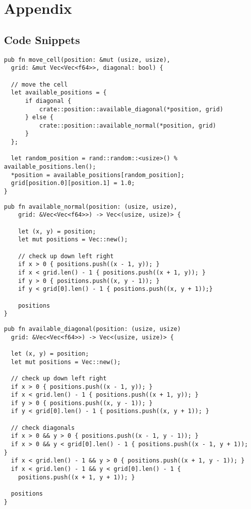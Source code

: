 \chapter{Appendix}

\section{Code Snippets} \label{sec:code}

\begin{lstlisting}[caption=Move Cell (Rust), label={lst:moveCell},captionpos=b]
pub fn move_cell(position: &mut (usize, usize), 
  grid: &mut Vec<Vec<f64>>, diagonal: bool) {

  // move the cell
  let available_positions = {
      if diagonal {
          crate::position::available_diagonal(*position, grid)
      } else {
          crate::position::available_normal(*position, grid)
      }
  };

  let random_position = rand::random::<usize>() % available_positions.len();
  *position = available_positions[random_position];
  grid[position.0][position.1] = 1.0;
}
\end{lstlisting}

\begin{lstlisting}[caption=Available Normal (Rust), label={lst:availableNormal},captionpos=b]
  pub fn available_normal(position: (usize, usize),
    grid: &Vec<Vec<f64>>) -> Vec<(usize, usize)> {

    let (x, y) = position;
    let mut positions = Vec::new();

    // check up down left right
    if x > 0 { positions.push((x - 1, y)); }
    if x < grid.len() - 1 { positions.push((x + 1, y)); }
    if y > 0 { positions.push((x, y - 1)); }
    if y < grid[0].len() - 1 { positions.push((x, y + 1));}

    positions
}
\end{lstlisting}

\clearpage

\begin{lstlisting}[caption=Available Diagonal (Rust), label={lst:availableDiagonal},captionpos=b]
pub fn available_diagonal(position: (usize, usize)
  grid: &Vec<Vec<f64>>) -> Vec<(usize, usize)> {

  let (x, y) = position;
  let mut positions = Vec::new();

  // check up down left right
  if x > 0 { positions.push((x - 1, y)); }
  if x < grid.len() - 1 { positions.push((x + 1, y)); }
  if y > 0 { positions.push((x, y - 1)); }
  if y < grid[0].len() - 1 { positions.push((x, y + 1)); }

  // check diagonals
  if x > 0 && y > 0 { positions.push((x - 1, y - 1)); }
  if x > 0 && y < grid[0].len() - 1 { positions.push((x - 1, y + 1)); }
  if x < grid.len() - 1 && y > 0 { positions.push((x + 1, y - 1)); }
  if x < grid.len() - 1 && y < grid[0].len() - 1 { 
    positions.push((x + 1, y + 1)); }

  positions
}
\end{lstlisting}

